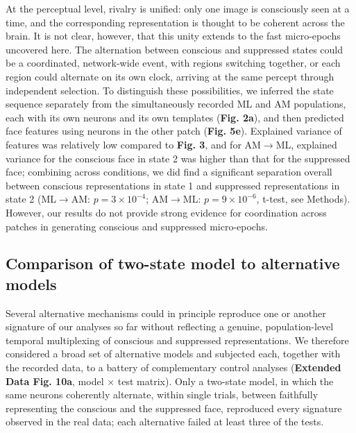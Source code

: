 \documentclass{article}
\begin{document}
At the perceptual level, rivalry is unified: only one image is consciously seen at a time, and the corresponding representation is thought to be coherent across the brain. It is not clear, however, that this unity extends to the fast micro-epochs uncovered here. The alternation between conscious and suppressed states could be a coordinated, network-wide event, with regions switching together, or each region could alternate on its own clock, arriving at the same percept through independent selection. To distinguish these possibilities, we inferred the state sequence separately from the simultaneously recorded ML and AM populations, each with its own neurons and its own templates (\textbf{Fig. 2a}), and then predicted face features using neurons in the other patch (\textbf{Fig. 5e}). Explained variance of features was relatively low compared to \textbf{Fig. 3}, and for AM$\rightarrow$ML, explained variance for the conscious face in state 2 was higher than that for the suppressed face; combining across conditions, we did find a significant separation overall between conscious representations in state 1 and suppressed representations in state 2 (ML$\rightarrow$AM: $p = 3 \times 10^{-4}$; AM$\rightarrow$ML: $p = 9 \times 10^{-6}$, t-test, see Methods). However, our results do not provide strong evidence for coordination across patches in generating conscious and suppressed micro-epochs.

\subsection*{Comparison of two-state model to alternative models}

Several alternative mechanisms could in principle reproduce one or another signature of our analyses so far without reflecting a genuine, population-level temporal multiplexing of conscious and suppressed representations. We therefore considered a broad set of alternative models and subjected each, together with the recorded data, to a battery of complementary control analyses (\textbf{Extended Data Fig. 10a}, model $\times$ test matrix). Only a two-state model, in which the same neurons coherently alternate, within single trials, between faithfully representing the conscious and the suppressed face, reproduced every signature observed in the real data; each alternative failed at least three of the tests.
\end{document}
